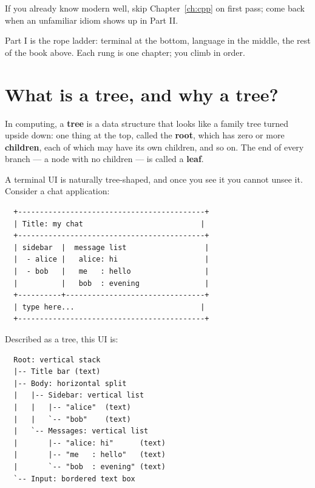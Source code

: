 If you already know modern \cpp{} well, skip Chapter~\ref{ch:cpp} on
first pass; come back when an unfamiliar idiom shows up in Part II.

\begin{idea}
Part I is the rope ladder: terminal at the bottom, language in the
middle, the rest of the book above. Each rung is one chapter; you
climb in order.
\end{idea}

\section{What is a tree, and why a tree?}
\label{sec:intro:tree}

In computing, a \textbf{tree} is a data structure that looks like a
family tree turned upside down: one thing at the top, called the
\textbf{root}, which has zero or more \textbf{children}, each of
which may have its own children, and so on. The end of every branch
--- a node with no children --- is called a \textbf{leaf}.

A terminal UI is naturally tree-shaped, and once you see it you
cannot unsee it. Consider a chat application:

\begin{center}
\small
\begin{verbatim}
  +-------------------------------------------+
  | Title: my chat                           |
  +-------------------------------------------+
  | sidebar  |  message list                  |
  |  - alice |   alice: hi                    |
  |  - bob   |   me   : hello                 |
  |          |   bob  : evening               |
  +----------+--------------------------------+
  | type here...                             |
  +-------------------------------------------+
\end{verbatim}
\end{center}

Described as a tree, this UI is:

\begin{center}
\small
\begin{verbatim}
  Root: vertical stack
  |-- Title bar (text)
  |-- Body: horizontal split
  |   |-- Sidebar: vertical list
  |   |   |-- "alice"  (text)
  |   |   `-- "bob"    (text)
  |   `-- Messages: vertical list
  |       |-- "alice: hi"      (text)
  |       |-- "me   : hello"   (text)
  |       `-- "bob  : evening" (text)
  `-- Input: bordered text box
\end{verbatim}
\end{center}

